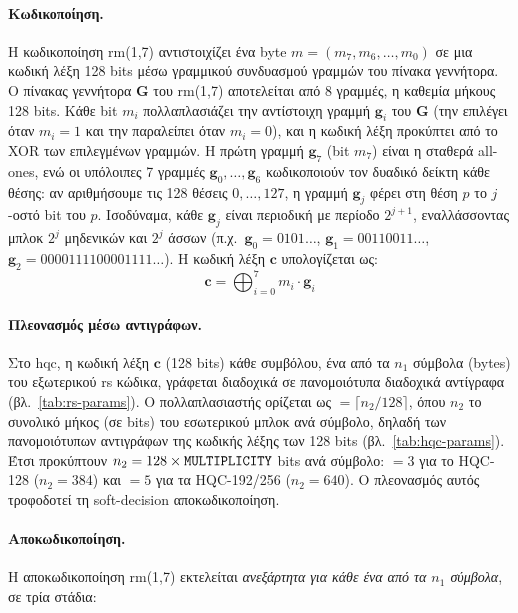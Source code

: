\paragraph{Κωδικοποίηση.}
Η κωδικοποίηση \gls{rm}(1,7) αντιστοιχίζει ένα byte $m = (m_7, m_6, \ldots, m_0)$
σε μια κωδική λέξη 128 bits μέσω γραμμικού συνδυασμού γραμμών του πίνακα γεννήτορα.
Ο πίνακας γεννήτορα $\mathbf{G}$ του \gls{rm}(1,7) αποτελείται από 8 γραμμές, η
καθεμία μήκους 128 bits. Κάθε bit $m_i$ πολλαπλασιάζει την αντίστοιχη γραμμή $\mathbf{g}_i$ του
$\mathbf{G}$ (την επιλέγει όταν $m_i = 1$ και την παραλείπει όταν $m_i = 0$), και
η κωδική λέξη προκύπτει από το XOR των επιλεγμένων γραμμών. Η πρώτη γραμμή $\mathbf{g}_7$ (bit $m_7$) είναι η σταθερά
all-ones, ενώ οι υπόλοιπες 7 γραμμές $\mathbf{g}_0, \ldots, \mathbf{g}_6$
κωδικοποιούν τον δυαδικό δείκτη κάθε θέσης: αν αριθμήσουμε τις 128 θέσεις
$0, \ldots, 127$, η γραμμή $\mathbf{g}_j$ φέρει στη θέση $p$ το $j$-οστό bit
του $p$. Ισοδύναμα, κάθε $\mathbf{g}_j$ είναι περιοδική με περίοδο $2^{j+1}$,
εναλλάσσοντας μπλοκ $2^j$ μηδενικών και $2^j$ άσσων (π.χ.\ $\mathbf{g}_0 =
0101\ldots$, $\mathbf{g}_1 = 00110011\ldots$, $\mathbf{g}_2 =
0000111100001111\ldots$).
Η κωδική λέξη $\mathbf{c}$ υπολογίζεται ως:
\begin{equation}
  \label{eq:rm-encoding}
  \mathbf{c} = \bigoplus_{i=0}^{7} m_i \cdot \mathbf{g}_i
\end{equation}

\paragraph{Πλεονασμός μέσω αντιγράφων.}
Στο \gls{hqc}, η κωδική λέξη $\mathbf{c}$ (128 bits) κάθε συμβόλου, ένα από τα $n_1$ σύμβολα 
(bytes) του εξωτερικού \gls{rs} κώδικα, γράφεται διαδοχικά σε
 πανομοιότυπα διαδοχικά αντίγραφα (βλ.~\cref{tab:rs-params}). Ο πολλαπλασιαστής ορίζεται ως 
 $= \lceil n_2 / 128 \rceil$, όπου $n_2$ το συνολικό μήκος (σε bits) 
του εσωτερικού μπλοκ ανά σύμβολο, δηλαδή των  πανομοιότυπων αντιγράφων της 
κωδικής λέξης των 128 bits (βλ.~\cref{tab:hqc-params}). Έτσι προκύπτουν
$n_2 = 128 \times \texttt{MULTIPLICITY}$ bits ανά σύμβολο: 
${}= 3$ για το HQC-128 ($n_2 = 384$) και  ${}= 5$ για τα
HQC-192/256 ($n_2 = 640$). Ο πλεονασμός αυτός τροφοδοτεί τη soft-decision
αποκωδικοποίηση.

\paragraph{Αποκωδικοποίηση.}
Η αποκωδικοποίηση \gls{rm}(1,7) εκτελείται \emph{ανεξάρτητα για κάθε ένα από τα $n_1$ σύμβολα}, σε τρία στάδια:


